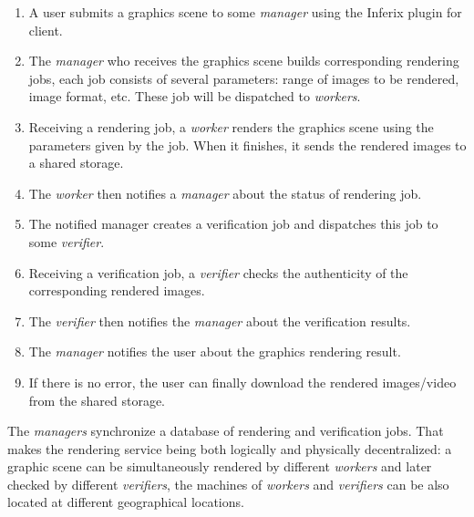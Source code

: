\begin{enumerate}
    \item A user submits a graphics scene to some \emph{manager} using the Inferix plugin for client.
    \item The \emph{manager} who receives the graphics scene builds corresponding rendering jobs, each job consists of several parameters: range of images to be rendered, image format, etc. These job will be dispatched to \emph{workers}.
    \item Receiving a rendering job, a \emph{worker} renders the graphics scene using the parameters given by the job. When it finishes, it sends the rendered images to a shared storage.
    \item The \emph{worker} then notifies a \emph{manager} about the status of rendering job.
    \item The notified manager creates a verification job and dispatches this job to some \emph{verifier}.
    \item Receiving a verification job, a \emph{verifier} checks the authenticity of the corresponding rendered images.
    \item The \emph{verifier} then notifies the \emph{manager} about the verification results.
    \item The \emph{manager} notifies the user about the graphics rendering result.
    \item If there is no error, the user can finally download the rendered images/video from the shared storage.
\end{enumerate}
The \emph{managers} synchronize a database of rendering and verification jobs. That makes the rendering service  being both logically and physically decentralized: a graphic scene can be simultaneously rendered by different \emph{workers} and later checked by different \emph{verifiers}, the machines of \emph{workers} and \emph{verifiers} can be also located at different geographical locations.

